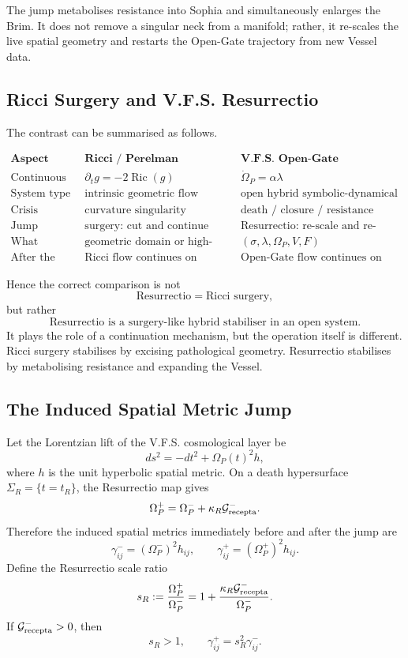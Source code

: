 \documentclass[11pt,a4paper,oneside]{book}
\newcommand{\Ric}{\operatorname{Ric}}
\theoremstyle{plain}
\theoremstyle{definition}
\theoremstyle{remark}
\begin{document}
The jump metabolises resistance into Sophia and simultaneously enlarges the
Brim. It does not remove a singular neck from a manifold; rather, it re-scales
the live spatial geometry and restarts the Open-Gate trajectory from new
Vessel data.

\subsection{Ricci Surgery and V.F.S. Resurrectio}

The contrast can be summarised as follows.

\[
\begin{array}{c|c|c}
\textbf{Aspect} & \textbf{Ricci / Perelman} & \textbf{V.F.S. Open-Gate} \\
\hline
\text{Continuous law}
&
\partial_t g=-2\Ric(g)
&
\dot{\Omega}_P=\alpha\lambda
\\
\text{System type}
&
\text{intrinsic geometric flow}
&
\text{open hybrid symbolic-dynamical flow}
\\
\text{Crisis}
&
\text{curvature singularity}
&
\text{death / closure / resistance threshold}
\\
\text{Jump}
&
\text{surgery: cut and continue}
&
\text{Resurrectio: re-scale and re-enter}
\\
\text{What changes}
&
\text{geometric domain or high-curvature region}
&
(\sigma,\lambda,\Omega_P,V,F)
\\
\text{After the event}
&
\text{Ricci flow continues on modified geometry}
&
\text{Open-Gate flow continues on renewed Vessel data}
\end{array}
\]

Hence the correct comparison is not
\[
\text{Resurrectio}=\text{Ricci surgery},
\]
but rather
\[
\boxed{
\text{Resurrectio is a surgery-like hybrid stabiliser in an open system.}
}
\]
It plays the role of a continuation mechanism, but the operation itself is
different. Ricci surgery stabilises by excising pathological geometry.
Resurrectio stabilises by metabolising resistance and expanding the Vessel.

\subsection{The Induced Spatial Metric Jump}

Let the Lorentzian lift of the V.F.S. cosmological layer be
\[
ds^2=-dt^2+\Omega_P(t)^2h,
\]
where \(h\) is the unit hyperbolic spatial metric. On a death hypersurface
\(\Sigma_R=\{t=t_R\}\), the Resurrectio map gives
\[
\Omega_P^+=\Omega_P^-+\kappa_R\mathcal G^-_{\rm recepta}.
\]
Therefore the induced spatial metrics immediately before and after the jump are
\[
\gamma^-_{ij}=(\Omega_P^-)^2h_{ij},
\qquad
\gamma^+_{ij}=(\Omega_P^+)^2h_{ij}.
\]
Define the Resurrectio scale ratio
\[
s_R:=\frac{\Omega_P^+}{\Omega_P^-}
=
1+\frac{\kappa_R\mathcal G^-_{\rm recepta}}{\Omega_P^-}.
\]
If \(\mathcal G^-_{\rm recepta}>0\), then
\[
s_R>1,
\qquad
\gamma^+_{ij}=s_R^2\gamma^-_{ij}.
\]
\end{document}
